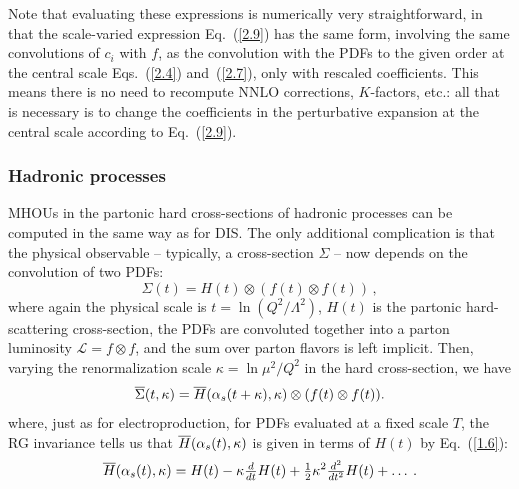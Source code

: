 Note that evaluating these expressions is numerically very
straightforward, in that the scale-varied expression
Eq.~(\ref{2.9}) has the same form, involving the same
convolutions of $c_i$ with $f$, as the
convolution with the PDFs to the given order at the central scale
Eqs.~(\ref{2.4}) and~(\ref{2.7}),  only with rescaled coefficients.
%
This means there is no need to recompute NNLO corrections, $K$-factors, etc.: all
that is necessary is to change the coefficients in the perturbative expansion at
the central scale according to Eq.~(\ref{2.9}).  

\subsubsection{Hadronic processes}

MHOUs in the partonic hard cross-sections of
hadronic processes can be computed  in the same way as for DIS.
%
The only additional
 complication is that the physical observable -- typically, a
cross-section $\Sigma$ -- now depends on the convolution of two PDFs:
\begin{equation}\label{H.1}
    \Sigma(t) = H(t)\otimes( {f}(t)\otimes  {f}(t)) \, ,
\end{equation}
 where again the physical scale is $t = \ln (Q^2 / \Lambda^2)$, $H(t)$
 is the partonic hard-scattering cross-section,  the PDFs are convoluted
 together into a parton luminosity $\mathcal{L}=f\otimes f$, and  the sum
 over parton flavors is left implicit.
%
 Then, varying the
 renormalization scale $\kappa = \ln \mu^2/Q^2$ in the hard
 cross-section, we have 
\begin{equation}\label{H.2}
  \overline{\Sigma}(t,\kappa) = \overline{H} (\alpha_s(t+\kappa), \kappa)\otimes(f(t)\otimes f(t)).
\end{equation}
where, just as for electroproduction, for PDFs evaluated at a fixed scale $T$, the
RG invariance tells us that $\overline{H} (\alpha_s(t),
\kappa)$ is given in terms of $H(t)$ by Eq.~(\ref{1.6}):  
%
\begin{equation} \label{1.6a}
	\overline{H}(\alpha_s(t), \kappa) = H(t) - \kappa \hbox{${{d}\over {dt}}$} H(t) + \hbox{${{1}\over {2}}$} \kappa^2  \hbox{${{d^2}\over {dt^2}}$} H(t)+\ldots\>.
\end{equation}

